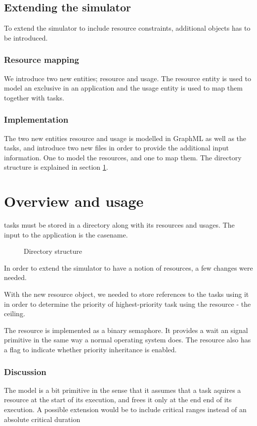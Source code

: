 \documentclass{acm_proc_article-sp}
\begin{document}
\subsection{Extending the simulator}
To extend the simulator to include resource constraints, additional objects has to be introduced.
\subsubsection{Resource mapping}
We introduce two new entities; resource and usage. The resource entity is used to model an exclusive in an application and the usage entity is used to map them together with tasks.



\subsubsection{Implementation}
The two new entities resource and usage is modelled in GraphML as well as the tasks, and introduce two new files in order to provide the additional input information. One to model the resources, and one to map them. The directory structure is explained in section \ref{sec:overview}.
\section{Overview and usage}
\label{sec:overview}
tasks must be stored in a directory along with its resources and usages. The input to the application is the casename.
\begin{figure}[h]
\centering
{}
\caption{Directory structure}
\label{fig:directory_structure}
\end{figure}
In order to extend the simulator to have a notion of resources, a few changes were needed.

With the new resource object, we needed to store references to the tasks using it in order to determine the priority of highest-priority task using the resource - the ceiling.

The resource is implemented as a binary semaphore. It provides a wait an signal primitive in the same way a normal operating system does. The resource also has a flag to indicate whether priority inheritance is enabled.


\subsubsection{Discussion}
The model is a bit primitive in the sense that it assumes that a task aquires a resource at the start of its execution, and frees it only at the end end of its execution. A possible extension would be to include critical ranges instead of an absolute critical duration
\end{document}
